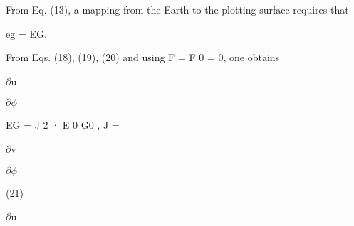 \documentclass[a4paper,portrait,12pt]{article}
\begin{document}
\begin{flushleft}
From Eq. (13), a mapping from the Earth to the plotting surface requires that
\end{flushleft}


\begin{flushleft}
eg = EG.
\end{flushleft}


\begin{flushleft}
From Eqs. (18), (19), (20) and using F = F 0 = 0, one obtains
\end{flushleft}


\newpage



\begin{flushleft}
\newpage
 $\partial$u
\end{flushleft}


\newpage



\begin{flushleft}
\newpage
 $\partial$$\phi$
\end{flushleft}


\newpage



\begin{flushleft}
EG = J 2 · E 0 G0 , J = \newpage

\end{flushleft}


\begin{flushleft}
\newpage
 $\partial$v
\end{flushleft}


\newpage



\newpage



\begin{flushleft}
$\partial$$\phi$
\end{flushleft}





(21)





\newpage



\begin{flushleft}
$\partial$u \newpage

\end{flushleft}


\newpage
\end{document}
